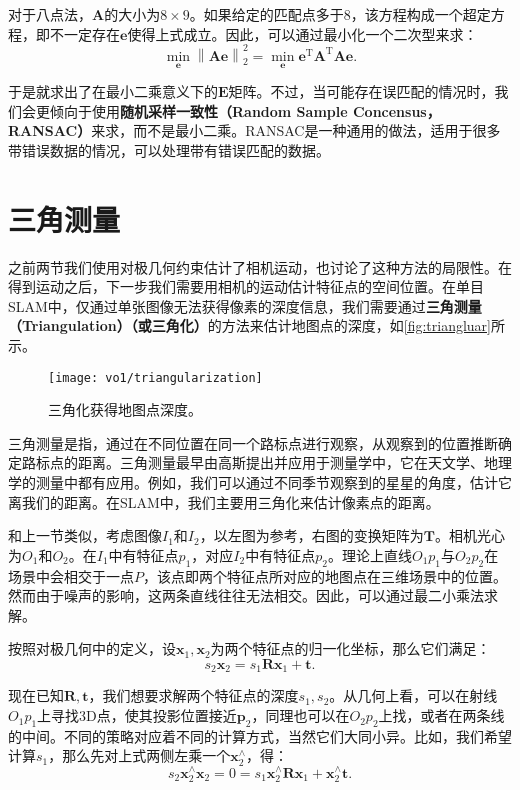 对于八点法，$\bm{A}$的大小为$8 \times 9$。如果给定的匹配点多于$8$，该方程构成一个超定方程，即不一定存在$\bm{e}$使得上式成立。因此，可以通过最小化一个二次型来求：
\begin{equation}
\mathop {\min }\limits_{\bm{e}} \left\| \bm{Ae} \right\|_2^2 = \mathop {\min }\limits_{\bm{e}} { \bm{e}^\mathrm{T}} {\bm{A}^\mathrm{T}} \bm{Ae}.
\end{equation}

于是就求出了在最小二乘意义下的$\bm{E}$矩阵。不过，当可能存在误匹配的情况时，我们会更倾向于使用\textbf{随机采样一致性（Random Sample Concensus，RANSAC）}来求，而不是最小二乘。RANSAC是一种通用的做法，适用于很多带错误数据的情况，可以处理带有错误匹配的数据。

\section{三角测量}
之前两节我们使用对极几何约束估计了相机运动，也讨论了这种方法的局限性。在得到运动之后，下一步我们需要用相机的运动估计特征点的空间位置。在单目SLAM中，仅通过单张图像无法获得像素的深度信息，我们需要通过\textbf{三角测量（Triangulation）（或三角化）}的方法来估计地图点的深度，如\autoref{fig:triangluar}所示。

\begin{figure}[!ht]
	\centering
	\texttt{[image: vo1/triangularization]}
	\caption{三角化获得地图点深度。}
	\label{fig:triangluar}
\end{figure}

三角测量是指，通过在不同位置在同一个路标点进行观察，从观察到的位置推断确定路标点的距离。三角测量最早由高斯提出并应用于测量学中，它在天文学、地理学的测量中都有应用。例如，我们可以通过不同季节观察到的星星的角度，估计它离我们的距离。在SLAM中，我们主要用三角化来估计像素点的距离。

和上一节类似，考虑图像$I_{1}$和$I_{2}$，以左图为参考，右图的变换矩阵为$\bm{T}$。相机光心为$O_{1}$和$O_{2}$。在$I_{1}$中有特征点$p_{1}$，对应$I_{2}$中有特征点$p_{2}$。理论上直线$O_{1}p_{1}$与$O_{2}p_{2}$在场景中会相交于一点$P$，该点即两个特征点所对应的地图点在三维场景中的位置。然而由于噪声的影响，这两条直线往往无法相交。因此，可以通过最二小乘法求解。

按照对极几何中的定义，设$\bm{x}_1, \bm{x}_2$为两个特征点的归一化坐标，那么它们满足：
\begin{equation}
s_2 \bm{x}_2 = s_1  \bm{R} \bm{x}_1 + \bm{t}.  
\end{equation}

现在已知$\bm{R}, \bm{t}$，我们想要求解两个特征点的深度$s_1, s_2$。从几何上看，可以在射线$O_1 p_1$上寻找3D点，使其投影位置接近$\bm{p}_2$，同理也可以在$O_2 p_2$上找，或者在两条线的中间。不同的策略对应着不同的计算方式，当然它们大同小异。比如，我们希望计算$s_1$，那么先对上式两侧左乘一个$\bm{x}_2^\wedge$，得：
\begin{equation}
\label{eq:x1tox2}
s_2 \bm{x}_2^\wedge \bm{x}_2 = 0 = s_1 \bm{x}_2^\wedge \bm{R} \bm{x}_1 + \bm{x}_2^\wedge \bm{t}. 
\end{equation}

